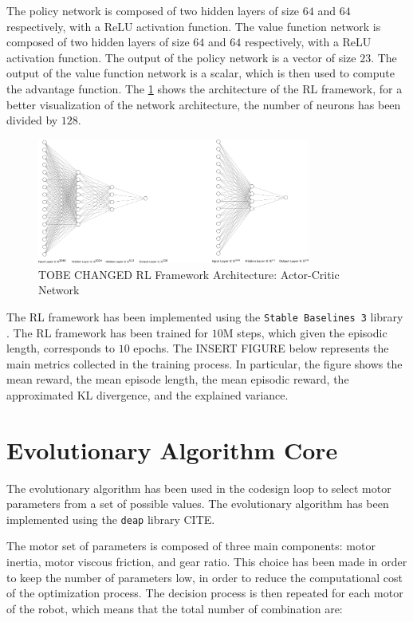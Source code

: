 The policy network is composed of two hidden layers of size $64$ and $64$ respectively, with a \ac{ReLU} activation function. The value function network is composed of two hidden layers of size $64$ and $64$ respectively, with a \ac{ReLU} activation function. The output of the policy network is a vector of size $23$. The output of the value function network is a scalar, which is then used to compute the advantage function. The \cref{fig:rlarchitecture} shows the architecture of the \ac{RL} framework, for a better visualization of the network architecture, the number of neurons has been divided by $128$.

\begin{figure}[h]
    \centering
    \includegraphics[width=0.8\textwidth]{Images/rl_architecture.png}
    \caption{TOBE CHANGED RL Framework Architecture: Actor-Critic Network}
    \label{fig:rlarchitecture}
\end{figure}

The \ac{RL} framework has been implemented using the \texttt{Stable Baselines 3} library \citep{raffin_stable-baselines3_2021}. The \ac{RL} framework has been trained for $10$M steps, which given the episodic length, corresponds to $10$ epochs. The INSERT FIGURE below represents the main metrics collected in the training process. In particular, the figure shows the mean reward, the mean episode length, the mean episodic reward, the approximated KL divergence, and the explained variance.


\section{Evolutionary Algorithm Core}
\label{sec:EvolutionAlgo}


The evolutionary algorithm has been used in the codesign loop to select motor parameters from a set of possible values. The evolutionary algorithm has been implemented using the \texttt{deap} library CITE.

The motor set of parameters is composed of three main components: motor inertia, motor viscous friction, and gear ratio. This choice has been made in order to keep the number of parameters low, in order to reduce the computational cost of the optimization process. The decision process is then repeated for each motor of the robot, which means that the total number of combination are:

